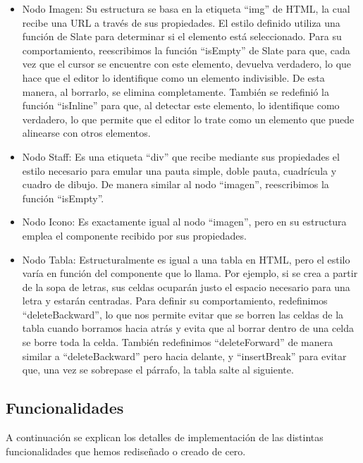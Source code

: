 \begin{itemize}
  \item Nodo Imagen: Su estructura se basa en la etiqueta ``img'' de HTML, la cual recibe una URL a través de sus propiedades. El estilo definido utiliza una función de Slate para determinar si el elemento está seleccionado. Para su comportamiento, reescribimos la función ``isEmpty'' de Slate para que, cada vez que el cursor se encuentre con este elemento, devuelva verdadero, lo que hace que el editor lo identifique como un elemento indivisible. De esta manera, al borrarlo, se elimina completamente. También se redefinió la función ``isInline'' para que, al detectar este elemento, lo identifique como verdadero, lo que permite que el editor lo trate como un elemento que puede alinearse con otros elementos.
  \item Nodo Staff: Es una etiqueta ``div'' que recibe mediante sus propiedades el estilo necesario para emular una pauta simple, doble pauta, cuadrícula y cuadro de dibujo. De manera similar al nodo ``imagen'', reescribimos la función ``isEmpty''.
  \item Nodo Icono: Es exactamente igual al nodo ``imagen'', pero en su estructura emplea el componente recibido por sus propiedades.
  \item Nodo Tabla: Estructuralmente es igual a una tabla en HTML, pero el estilo varía en función del componente que lo llama. Por ejemplo, si se crea a partir de la sopa de letras, sus celdas ocuparán justo el espacio necesario para una letra y estarán centradas. Para definir su comportamiento, redefinimos ``deleteBackward'', lo que nos permite evitar que se borren las celdas de la tabla cuando borramos hacia atrás y evita que al borrar dentro de una celda se borre toda la celda. También redefinimos ``deleteForward'' de manera similar a ``deleteBackward'' pero hacia delante, y ``insertBreak'' para evitar que, una vez se sobrepase el párrafo, la tabla salte al siguiente.
\end{itemize}

\subsection{Funcionalidades}
A continuación se explican los detalles de implementación de las distintas funcionalidades que hemos rediseñado o creado de cero.

